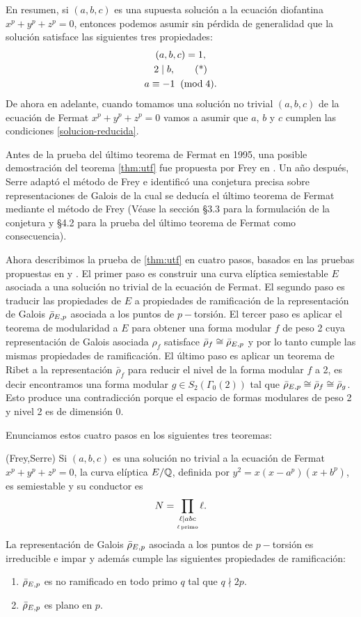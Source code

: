 En resumen, si $(a,b,c)$ es una supuesta solución a la ecuación diofantina $x^p+y^p+z^p=0$, entonces podemos asumir sin pérdida de generalidad que la solución satisface las siguientes tres propiedades:
\begin{gather}
	(a,b,c)=1, \nonumber\\
	2\mid b, \label{solucion-reducida}\tag{*}\\
	a\equiv -1\;\;(\mathrm{mod}\; 4). \nonumber
\end{gather}
De ahora en adelante, cuando tomamos una solución no trivial $(a,b,c)$ de la ecuación de Fermat $x^p+y^p+z^p=0$ vamos a asumir que $a$, $b$ y $c$ cumplen las condiciones \ref{solucion-reducida}.

Antes de la prueba del último teorema de Fermat en 1995, una posible demostración del teorema \ref{thm:utf} fue propuesta por Frey en \cite[III. Conjectures]{Frey86}. Un año después, Serre adaptó el método de Frey e identificó una conjetura precisa sobre representaciones de Galois de la cual se deducía el último teorema de Fermat mediante el método de Frey (Véase la sección \S3.3 para la formulación de la conjetura y \S4.2 para la prueba del último teorema de Fermat como consecuencia).

Ahora describimos la prueba de \ref{thm:utf} en cuatro pasos, basados en las pruebas propuestas en \cite{Frey86} y \cite{Serre87}. El primer paso es construir una curva elíptica semiestable $E$ asociada a una solución no trivial de la ecuación de Fermat. El segundo paso es traducir las propiedades de $E$ a propiedades de ramificación de la representación de Galois $\bar{\rho}_{E,p}$ asociada a los puntos de $p-$torsión. El tercer paso es aplicar el teorema de modularidad a $E$ para obtener una forma modular $f$ de peso 2 cuya representación de Galois asociada $\rho_f$ satisface $\bar{\rho}_f\cong\bar{\rho}_{E,p}$ y por lo tanto cumple las mismas propiedades de ramificación. El último paso es aplicar un teorema de Ribet a la representación $\bar{\rho}_f$ para reducir el nivel de la forma modular $f$ a 2, es decir encontramos una forma modular $g\in S_2(\Gamma_0(2))$ tal que $\bar{\rho}_{E,p}\cong\bar{\rho}_f\cong\bar{\rho}_g$. Esto produce una contradicción porque el espacio de formas modulares de peso 2 y nivel 2 es de dimensión 0.

Enunciamos estos cuatro pasos en los siguientes tres teoremas:

\begin{thm}\label{thm:frey}(Frey,Serre)
		Si $(a,b,c)$ es una solución no trivial a la ecuación de Fermat $x^p+y^p+z^p=0$, la curva elíptica $E/\mathbb{Q}$, definida por $y^2=x(x-a^p)(x+b^p)$, es semiestable y su conductor es
		\[
			N=\prod_{\underset{\ell\,\mathrm{primo}}{\ell\mid abc}}\ell.
		\]
		La representación de Galois $\bar{\rho}_{E,p}$ asociada a los puntos de $p-$torsión es irreducible e impar y además cumple las siguientes propiedades de ramificación:
		\begin{enumerate}[label=\roman*)]
			\item $\bar{\rho}_{E,p}$ es no ramificado en todo primo $q$ tal que $q\nmid 2p$.
			\item $\bar{\rho}_{E,p}$ es plano en $p$.
		\end{enumerate}
\end{thm}

